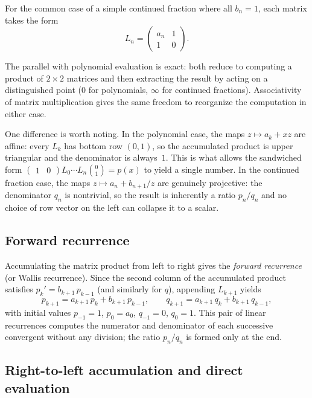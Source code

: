 \documentclass{article}
\begin{document}
For the common case of a simple continued fraction where all $b_n = 1$, each matrix takes the form
\begin{equation}
  L_n = \begin{pmatrix} a_n & 1 \\ 1 & 0 \end{pmatrix}.
\end{equation}

The parallel with polynomial evaluation is exact: both reduce to computing a product of $2 \times 2$ matrices and then extracting the result by acting on a distinguished point ($0$ for polynomials, $\infty$ for continued fractions). Associativity of matrix multiplication gives the same freedom to reorganize the computation in either case.

One difference is worth noting. In the polynomial case, the maps $z \mapsto a_k + xz$ are affine: every $L_k$ has bottom row $(0, 1)$, so the accumulated product is upper triangular and the denominator is always~$1$. This is what allows the sandwiched form $\begin{pmatrix} 1 & 0 \end{pmatrix} L_0 \cdots L_n \binom{0}{1} = p(x)$ to yield a single number. In the continued fraction case, the maps $z \mapsto a_n + b_{n+1}/z$ are genuinely projective: the denominator $q_n$ is nontrivial, so the result is inherently a ratio $p_n / q_n$ and no choice of row vector on the left can collapse it to a scalar.

\subsection*{Forward recurrence}

Accumulating the matrix product from left to right gives the \emph{forward recurrence} (or Wallis recurrence). Since the second column of the accumulated product satisfies $p_k' = b_{k+1}\, p_{k-1}$ (and similarly for $q$), appending $L_{k+1}$ yields
\begin{equation}
  p_{k+1} = a_{k+1}\, p_k + b_{k+1}\, p_{k-1}, \qquad
  q_{k+1} = a_{k+1}\, q_k + b_{k+1}\, q_{k-1},
\end{equation}
with initial values $p_{-1} = 1$, $p_0 = a_0$, $q_{-1} = 0$, $q_0 = 1$. This pair of linear recurrences computes the numerator and denominator of each successive convergent without any division; the ratio $p_n/q_n$ is formed only at the end.

\subsection*{Right-to-left accumulation and direct evaluation}
\end{document}
